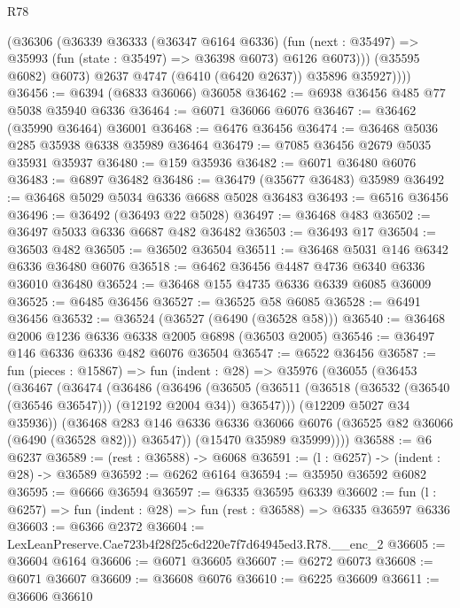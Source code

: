 \begin{lexlean}{R78}
\begin{coremodule}
              (@36306
                (@36339
                  @36333
                  (@36347 @6164 @6336)
                  (fun (next : @35497) =>
                  @35993 (fun (state : @35497) => @36398 @6073) @6126 @6073)))
              (@35595 @6082)
              @6073)
            @2637
            @4747
            (@6410 (@6420 @2637))
            @35896
            @35927))))
@36456 := @6394 (@6833 @36066) @36058
@36462 := @6938 @36456 @485 @77 @5038 @35940 @6336
@36464 := @6071 @36066 @6076
@36467 := @36462 (@35990 @36464) @36001
@36468 := @6476 @36456
@36474 := @36468 @5036 @285 @35938 @6338 @35989 @36464
@36479 := @7085 @36456 @2679 @5035 @35931 @35937
@36480 := @159 @35936
@36482 := @6071 @36480 @6076
@36483 := @6897 @36482
@36486 := @36479 (@35677 @36483) @35989
@36492 := @36468 @5029 @5034 @6336 @6688 @5028 @36483
@36493 := @6516 @36456
@36496 := @36492 (@36493 @22 @5028)
@36497 := @36468 @483
@36502 := @36497 @5033 @6336 @6687 @482 @36482
@36503 := @36493 @17
@36504 := @36503 @482
@36505 := @36502 @36504
@36511 := @36468 @5031 @146 @6342 @6336 @36480 @6076
@36518 := @6462 @36456 @4487 @4736 @6340 @6336 @36010 @36480
@36524 := @36468 @155 @4735 @6336 @6339 @6085 @36009
@36525 := @6485 @36456
@36527 := @36525 @58 @6085
@36528 := @6491 @36456
@36532 := @36524 (@36527 (@6490 (@36528 @58)))
@36540 := @36468 @2006 @1236 @6336 @6338 @2005 @6898 (@36503 @2005)
@36546 := @36497 @146 @6336 @6336 @482 @6076 @36504
@36547 := @6522 @36456
@36587 := fun (pieces : @15867) =>
  fun (indent : @28) =>
  @35976
    (@36055
      (@36453
        (@36467
          (@36474
            (@36486
              (@36496
                (@36505
                  (@36511 (@36518 (@36532 (@36540 (@36546 @36547))) (@12192 @2004 @34)) @36547)))
              (@12209 @5027 @34 @35936))
            (@36468
              @283
              @146
              @6336
              @6336
              @36066
              @6076
              (@36525 @82 @36066 (@6490 (@36528 @82)))
              @36547))
          (@15470 @35989 @35999))))
@36588 := @6 @6237
@36589 := (rest : @36588) -> @6068
@36591 := (l : @6257) -> (indent : @28) -> @36589
@36592 := @6262 @6164
@36594 := @35950 @36592 @6082
@36595 := @6666 @36594
@36597 := @6335 @36595 @6339
@36602 := fun (l : @6257) => fun (indent : @28) => fun (rest : @36588) => @6335 @36597 @6336
@36603 := @6366 @2372
@36604 := LexLeanPreserve.Cae723b4f28f25c6d220e7f7d64945ed3.R78.__enc_2
@36605 := @36604 @6164
@36606 := @6071 @36605
@36607 := @6272 @6073
@36608 := @6071 @36607
@36609 := @36608 @6076
@36610 := @6225 @36609
@36611 := @36606 @36610

\end{coremodule}
\end{lexlean}
